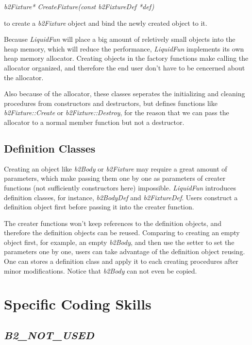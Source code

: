 \documentclass[UTF8]{ctexart}
\begin{document}
            \textit{b2Fixture* CreateFixture(const b2FixtureDef *def)}

            \noindent to create a \textit{b2Fixture} object and bind the newly created object to it.

            Because \textit{LiquidFun} will place a big amount of reletively small objects into the heap memory, which will reduce the performance, \textit{LiquidFun} implements its own heap memory allocator. Creating objects in the factory functions make calling the allocator organized, and therefore the end user don't have to be cencerned about the allocator.

            Also because of the allocator, these classes seperates the initializing and cleaning procedures from constructors and destructors, but defines functions like \textit{b2Fixture::Create} or \textit{b2Fixture::Destroy}, for the reason that we can pass the allocator to a normal member function but not a destructor.

        \subsection{Definition Classes}

            Creating an object like \textit{b2Body} or \textit{b2Fixture} may require a great amount of parameters, which make passing them one by one as parameters of creater functions (not sufficiently constructors here) impossible. \textit{LiquidFun} introduces definition classes, for instance, \textit{b2BodyDef} and \textit{b2FixtureDef}. Users construct a definition object first before passing it into the creater function.

            The creater functions won't keep references to the definition objects, and therefore the definition objects can be reused. Comparing to creating an empty object first, for example, an empty \textit{b2Body}, and then use the setter to set the parameters one by one, users can take advantage of the definition object reusing. One can stores a definition class and apply it to each creating procedures after minor modifications. Notice that \textit{b2Body} can not even be copied.

    \section{Specific Coding Skills}
        
        \subsection{\textit{B2\_NOT\_USED}}
\end{document}
